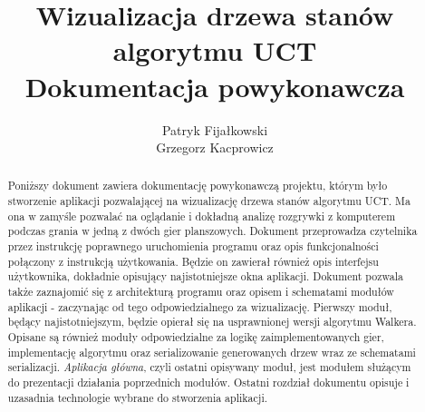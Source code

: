\documentclass{article}
\title{
	Wizualizacja drzewa stanów algorytmu UCT \\
	\large Dokumentacja powykonawcza}
\author{Patryk Fijałkowski \\ Grzegorz Kacprowicz}
\newcommand{\modulename}[1]{\textit{#1}}
\begin{document}
\begin{titlingpage}
	\maketitle
	\vspace{3cm}
	\begin{abstract}
		Poniższy dokument zawiera dokumentację powykonawczą projektu, którym było stworzenie aplikacji pozwalającej na wizualizację drzewa stanów algorytmu UCT. Ma ona w zamyśle pozwalać na oglądanie i dokładną analizę rozgrywki z komputerem podczas grania w jedną z dwóch gier planszowych. Dokument przeprowadza czytelnika przez instrukcję poprawnego uruchomienia programu oraz opis funkcjonalności połączony z instrukcją użytkowania. Będzie on zawierał również opis interfejsu użytkownika, dokładnie opisujący najistotniejsze okna aplikacji. Dokument pozwala także zaznajomić się z architekturą programu oraz opisem i schematami modułów aplikacji - zaczynając od tego odpowiedzialnego za wizualizację. Pierwszy moduł, będący najistotniejszym, będzie opierał się na usprawnionej wersji algorytmu Walkera. Opisane są również moduły odpowiedzialne za logikę zaimplementowanych gier, implementację algorytmu oraz serializowanie generowanych drzew wraz ze schematami serializacji. \modulename{Aplikacja główna}, czyli ostatni opisywany moduł, jest modułem służącym do prezentacji działania poprzednich modułów. Ostatni rozdział dokumentu opisuje i uzasadnia technologie wybrane do stworzenia aplikacji.
	\end{abstract}
\end{titlingpage}

\begin{versionhistory}
\end{versionhistory}
\tableofcontents
	
\end{document}
